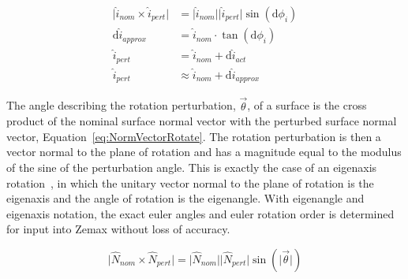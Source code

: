 \begin{subequations}		%
\label{eq:vectSmallAngle}
\begin{align}
	\label{eq:vectSmallAngle1}
	\vert \hat{i}_{nom} \times \hat{i}_{pert}  \vert &= \vert \hat{i}_{nom}\vert \vert \hat{i}_{pert} \vert \sin(\textrm{d}\phi_i) \\
	\label{eq:vectSmallAngle2}
	\textrm{d}\hat{i}_{approx}  &= \hat{i}_{nom} \cdot \tan(\textrm{d}\phi_i) \\
	\label{eq:vectSmallAngle3}
	\hat{i}_{pert}  &= \hat{i}_{nom} + \textrm{d}\hat{i}_{act} \\
	\label{eq:vectSmallAngle4}
	\hat{i}_{pert}  &\approx \hat{i}_{nom} + \textrm{d}\hat{i}_{approx}
\end{align}
\end{subequations}

The angle describing the rotation perturbation, $\vec{\theta}$, of a surface is the cross product of the nominal surface normal vector with the perturbed surface normal vector, Equation~\eqref{eq:NormVectorRotate}. The rotation perturbation is then a vector normal to the plane of rotation and has a magnitude equal to the modulus of the sine of the perturbation angle. This is exactly the case of an eigenaxis rotation~\cite{SweeneyNotes}, in which the unitary vector normal to the plane of rotation is the eigenaxis and the angle of rotation is the eigenangle. With eigenangle and eigenaxis notation, the exact euler angles and euler rotation order is determined for input into Zemax without loss of accuracy.

\begin{equation}
\label{eq:NormVectorRotate}
\vert \hat{N}_{nom} \times \hat{N}_{pert}  \vert = \vert \hat{N}_{nom}\vert \vert \hat{N}_{pert} \vert \sin(\vert \vec{\theta} \vert)
\end{equation}

